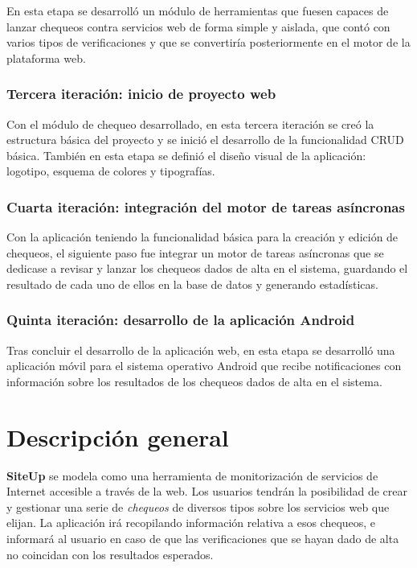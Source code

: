 \documentclass[a4paper,12pt]{article}
\begin{document}
En esta etapa se desarrolló un módulo de herramientas que fuesen capaces de
lanzar chequeos contra servicios web de forma simple y aislada, que contó con
varios tipos de verificaciones y que se convertiría posteriormente en el motor
de la plataforma web.

\subsubsection{Tercera iteración: inicio de proyecto web}

Con el módulo de chequeo desarrollado, en esta tercera iteración se creó la
estructura básica del proyecto y se inició el desarrollo de la funcionalidad
CRUD básica. También en esta etapa se definió el diseño visual de la aplicación:
logotipo, esquema de colores y tipografías.

\subsubsection{Cuarta iteración: integración del motor de tareas asíncronas}

Con la aplicación teniendo la funcionalidad básica para la creación y edición de
chequeos, el siguiente paso fue integrar un motor de tareas asíncronas que se
dedicase a revisar y lanzar los chequeos dados de alta en el sistema, guardando
el resultado de cada uno de ellos en la base de datos y generando estadísticas.

\subsubsection{Quinta iteración: desarrollo de la aplicación Android}

Tras concluir el desarrollo de la aplicación web, en esta etapa se desarrolló
una aplicación móvil para el sistema operativo Android que recibe notificaciones
con información sobre los resultados de los chequeos dados de alta en el sistema.



\section{Descripción general}

\textbf{SiteUp} se modela como una herramienta de monitorización de servicios de
Internet accesible a través de la web. Los usuarios tendrán la posibilidad de
crear y gestionar una serie de \textit{chequeos} de diversos tipos sobre los
servicios web que elijan. La aplicación irá recopilando información relativa a
esos chequeos, e informará al usuario en caso de que las verificaciones que se
hayan dado de alta no coincidan con los resultados esperados.
\end{document}
